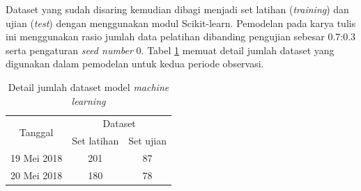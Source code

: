 Dataset yang sudah disaring kemudian dibagi menjadi set latihan
(\textit{training}) dan ujian (\textit{test}) dengan menggunakan modul
Scikit-learn. Pemodelan pada karya tulis ini menggunakan rasio jumlah data
pelatihan dibanding pengujian sebesar 0.7:0.3 serta pengaturan \textit{seed
number} 0. Tabel \ref{table:dataset} memuat detail jumlah dataset yang
digunakan dalam pemodelan untuk kedua periode observasi.

\begin{table}[!ht]
\begin{center}
\caption{Detail jumlah dataset model \textit{machine learning}}
\label{table:dataset}
\begin{tabular}{|c|cc|}
\hline
\multirow{2}{*}{Tanggal} & \multicolumn{2}{c|}{Dataset}                 \\ \cline{2-3} 
                         & \multicolumn{1}{c|}{Set latihan} & Set ujian \\ \hline
19 Mei 2018              & \multicolumn{1}{c|}{201}         & 87        \\ \hline
20 Mei 2018              & \multicolumn{1}{c|}{180}         & 78        \\ \hline
\end{tabular}
\end{center}
\vspace{-5mm}
\end{table}
